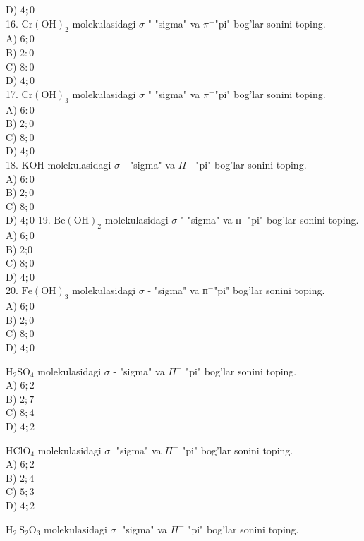 D) $4 ; 0$\\
16. $\mathrm{Cr}(\mathrm{OH})_{2}$ molekulasidagi $\sigma$ " "sigma" va $\pi^{-}$"pi" bog'lar sonini toping.\\
A) $6 ; 0$\\
B) $2: 0$\\
C) $8: 0$\\
D) $4 ; 0$\\
17. $\mathrm{Cr}(\mathrm{OH})_{3}$ molekulasidagi $\sigma$ " "sigma" va $\pi^{-}$"pi" bog'lar sonini toping.\\
A) $6: 0$\\
B) $2 ; 0$\\
C) $8 ; 0$\\
D) $4 ; 0$\\
18. KOH molekulasidagi $\sigma$ - "sigma" va $\Pi^{-}$ "pi" bog'lar sonini toping.\\
A) $6: 0$\\
B) $2 ; 0$\\
C) $8 ; 0$\\
D) $4 ; 0$
19. $\mathrm{Be}(\mathrm{OH})_{2}$ molekulasidagi $\sigma$ " "sigma" va п- "pi" bog'lar sonini toping.\\
A) $6 ; 0$\\
B) 2;0\\
C) $8 ; 0$\\
D) $4 ; 0$\\
20. $\mathrm{Fe}(\mathrm{OH})_{3}$ molekulasidagi $\sigma$ - "sigma" va $п^{-}$"pi" bog'lar sonini toping.\\
A) $6 ; 0$\\
B) $2 ; 0$\\
C) $8 ; 0$\\
D) $4 ; 0$
  \item $\mathrm{H}_{2} \mathrm{SO}_{4}$ molekulasidagi $\sigma$ - "sigma" va $\Pi^{-}$ "pi" bog'lar sonini toping.\\
A) $6 ; 2$\\
B) $2 ; 7$\\
C) $8 ; 4$\\
D) $4 ; 2$\\
  \item $\mathrm{HClO}_{4}$ molekulasidagi $\sigma^{-}$"sigma" va $\Pi^{-}$ "pi" bog'lar sonini toping.\\
A) $6 ; 2$\\
B) $2 ; 4$\\
C) $5 ; 3$\\
D) $4 ; 2$
  \item $\mathrm{H}_{2} \mathrm{~S}_{2} \mathrm{O}_{3}$ molekulasidagi $\sigma^{-}$"sigma" va $\Pi^{-}$ "pi" bog'lar sonini toping.\\
